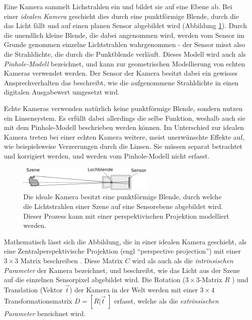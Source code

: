    Eine Kamera sammelt Lichstrahlen ein und bildet sie auf eine Ebene ab.
   Bei einer \emph{idealen Kamera} geschieht dies durch eine punktförmige Blende, durch die das Licht fällt und auf einen planen Sensor abgebildet wird (Abbildung \ref{fig:cam_model}). 
   Durch die unendlich kleine Blende, die dabei angenommen wird, werden vom Sensor im Grunde genommen einzelne Lichtstrahlen wahrgenommen  - der Sensor misst also die Strahldichte, die durch die Punktblende verläuft.
   Dieses Modell wird auch als \emph{Pinhole-Modell} bezeichnet, und kann zur geometrischen Modellierung von echten Kameras verwendet werden.   
   Der Sensor der Kamera besitzt dabei ein gewisses Ansprechverhalten das beschreibt, wie die aufgenommene Strahldichte in einen digitalen Ausgabewert umgesetzt wird. 

   Echte Kameras verwenden natürlich keine punktförmige Blende, sondern nutzen ein Linsensystem. 
   Es erfüllt dabei allerdings die selbe Funktion, weshalb auch sie mit dem Pinhole-Modell beschrieben werden können.
   Im Unterschied zur idealen Kamera treten bei einer echten Kamera  weitere, meist unerwünschte Effekte auf, wie beispielsweise Verzerrungen durch die Linsen. 
   Sie müssen separat betrachtet und korrigiert werden, und werden vom Pinhole-Modell nicht erfasst.
   
   \begin{figure}[H]
    \centering
    \includegraphics[width=0.6\textwidth]{../graphics/grundlagen/pinhole.svg}
    \caption[Funktionsweise einer idealen Kamera]{Die ideale Kamera besitzt eine punktförmige Blende, durch welche die Lichtstrahlen einer Szene auf eine Sensorebene abgebildet wird. Dieser Prozess kann mit einer perspektivischen Projektion modelliert werden.}
    \label{fig:cam_model}
   \end{figure}

  Mathematisch lässt sich die Abbildung, die in einer idealen Kamera geschieht, als eine Zentralperspektivische Projektion (engl ``perspective projection'') mit einer $3\times3$ Matrix beschreiben \cite{camera_matrix}.
   Diese Matrix  $C$ wird als auch als die \emph{intrinsischen Parameter} der Kamera bezeichnet, und beschreibt, wie das Licht aus der Szene auf die einzelnen Sensorpixel abgebildet wird.
   Die Rotation ($3\times3$-Matrix $R$ ) und Translation (Vektor $\vec{t}$) der Kamera in der Welt werden mit einer $3\times4$ Transformationsmatrix  $D=[R|\vec{t}\;]$ erfasst, welche als die \emph{extrinsischen Parameter} bezeichnet wird.

